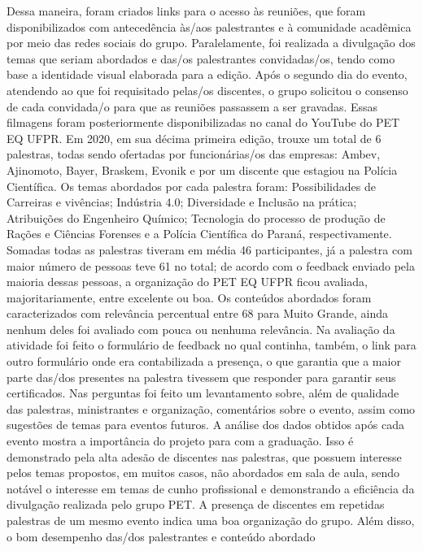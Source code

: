 Dessa maneira, foram criados links para o acesso às reuniões, que foram disponibilizados 
com antecedência às/aos palestrantes e à comunidade acadêmica por meio das redes sociais do 
grupo. Paralelamente, foi realizada a divulgação dos temas que seriam abordados e das/os 
palestrantes convidadas/os, tendo como base a identidade visual elaborada para a edição.
Após o segundo dia do evento, atendendo ao que foi requisitado pelas/os discentes, o grupo 
solicitou o consenso de cada convidada/o para que as reuniões passassem a ser gravadas. Essas 
filmagens foram posteriormente disponibilizadas no canal do YouTube do PET EQ UFPR.
Em 2020, em sua décima primeira edição, trouxe um total de 6 palestras, todas sendo 
ofertadas por funcionárias/os das empresas: Ambev, Ajinomoto, Bayer, Braskem, Evonik e por 
um discente que estagiou na Polícia Científica. Os temas abordados por cada palestra foram:
Possibilidades de Carreiras e vivências; Indústria 4.0; Diversidade e Inclusão na prática; 
Atribuições do Engenheiro Químico; Tecnologia do processo de produção de Rações e Ciências 
Forenses e a Polícia Científica do Paraná, respectivamente.
Somadas todas as palestras tiveram em média 46 participantes, já a palestra com maior 
número de pessoas teve 61 no total; de acordo com o feedback enviado pela maioria dessas 
pessoas, a organização do PET EQ UFPR ficou avaliada, majoritariamente, entre excelente ou boa. 
Os conteúdos abordados foram caracterizados com relevância percentual entre 68%
para Muito Grande, ainda nenhum deles foi avaliado com pouca ou nenhuma relevância.
Na avaliação da atividade foi feito o formulário de feedback no qual continha, também, o 
link para outro formulário onde era contabilizada a presença, o que garantia que a maior parte 
das/dos presentes na palestra tivessem que responder para garantir seus certificados. 
Nas perguntas foi feito um levantamento sobre, além de qualidade das palestras, 
ministrantes e organização, comentários sobre o evento, assim como sugestões de temas para 
eventos futuros. 
A análise dos dados obtidos após cada evento mostra a importância do projeto para com a 
graduação. Isso é demonstrado pela alta adesão de discentes nas palestras, que possuem interesse 
pelos temas propostos, em muitos casos, não abordados em sala de aula, sendo notável o interesse 
em temas de cunho profissional e demonstrando a eficiência da divulgação realizada pelo grupo 
PET.
A presença de discentes em repetidas palestras de um mesmo evento indica uma boa 
organização do grupo. Além disso, o bom desempenho das/dos palestrantes e conteúdo abordado 
